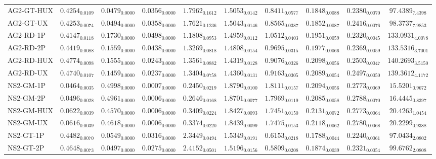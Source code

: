 \begin{longtable}{@{}lccccccccc@{}}
AG2-GT-HUX & $0.4254_{0.0109}$ & $0.0479_{0.0000}$ & $0.0356_{0.0000}$ & $1.7962_{0.1612}$ & $1.5053_{0.0142}$ & $0.8411_{0.0577}$ & $0.1848_{0.0088}$ & $0.2380_{0.0070}$ & $97.4389_{7.4398}$ \\
AG2-GT-UX & $0.4253_{0.0074}$ & $0.0494_{0.0000}$ & $0.0358_{0.0000}$ & $1.7621_{0.1236}$ & $1.5043_{0.0146}$ & $0.8565_{0.0387}$ & $0.1852_{0.0087}$ & $0.2416_{0.0076}$ & $98.3737_{7.9853}$ \\
AG2-RD-1P & $0.4147_{0.0118}$ & $0.1730_{0.0000}$ & $0.0498_{0.0000}$ & $1.1808_{0.0953}$ & $1.4959_{0.0112}$ & $1.0512_{0.0403}$ & $0.1951_{0.0059}$ & $0.2320_{0.0045}$ & $133.0931_{4.0078}$ \\
AG2-RD-2P & $0.4419_{0.0088}$ & $0.1559_{0.0000}$ & $0.0438_{0.0000}$ & $1.3269_{0.0818}$ & $1.4808_{0.0154}$ & $0.9695_{0.0315}$ & $0.1977_{0.0066}$ & $0.2369_{0.0059}$ & $133.5316_{3.7001}$ \\
AG2-RD-HUX & $0.4774_{0.0098}$ & $0.1555_{0.0000}$ & $0.0243_{0.0000}$ & $1.3561_{0.0882}$ & $1.4319_{0.0128}$ & $0.9076_{0.0326}$ & $0.2098_{0.0056}$ & $0.2503_{0.0047}$ & $140.2693_{3.5150}$ \\
AG2-RD-UX & $0.4740_{0.0107}$ & $0.1459_{0.0000}$ & $0.0237_{0.0000}$ & $1.3404_{0.0758}$ & $1.4360_{0.0131}$ & $0.9163_{0.0305}$ & $0.2089_{0.0054}$ & $0.2497_{0.0050}$ & $139.3612_{4.1172}$ \\
NS2-GM-1P & $0.0464_{0.0035}$ & $0.4998_{0.0000}$ & $0.0007_{0.0000}$ & $0.2450_{0.0219}$ & $1.8790_{0.0100}$ & $1.8111_{0.0157}$ & $0.2094_{0.0056}$ & $0.2773_{0.0069}$ & $15.5201_{0.9672}$ \\
NS2-GM-2P & $0.0496_{0.0028}$ & $0.4961_{0.0000}$ & $0.0006_{0.0000}$ & $0.2646_{0.0168}$ & $1.8701_{0.0077}$ & $1.7969_{0.0119}$ & $0.2085_{0.0058}$ & $0.2788_{0.0070}$ & $16.4445_{0.8397}$ \\
NS2-GM-HUX & $0.0622_{0.0039}$ & $0.4570_{0.0000}$ & $0.0006_{0.0000}$ & $0.3409_{0.0224}$ & $1.8427_{0.0093}$ & $1.7451_{0.0150}$ & $0.2131_{0.0072}$ & $0.2773_{0.0064}$ & $20.4263_{1.0454}$ \\
NS2-GM-UX & $0.0616_{0.0039}$ & $0.4618_{0.0000}$ & $0.0006_{0.0000}$ & $0.3374_{0.0220}$ & $1.8439_{0.0099}$ & $1.7475_{0.0153}$ & $0.2118_{0.0062}$ & $0.2780_{0.0068}$ & $20.2299_{0.9388}$ \\
NS2-GT-1P & $0.4482_{0.0070}$ & $0.0549_{0.0000}$ & $0.0316_{0.0000}$ & $\mathbf{2.3449}_{0.0494}$ & $1.5349_{0.0191}$ & $\mathbf{0.6153}_{0.0218}$ & $0.1788_{0.0044}$ & $0.2240_{0.0061}$ & $97.0434_{2.0802}$ \\
NS2-GT-2P & $0.4648_{0.0073}$ & $0.0497_{0.0000}$ & $0.0275_{0.0000}$ & $\mathbf{2.4152}_{0.0501}$ & $1.5196_{0.0156}$ & $\mathbf{0.5809}_{0.0208}$ & $0.1874_{0.0039}$ & $0.2321_{0.0054}$ & $99.6762_{2.0808}$ \\

\end{longtable}
